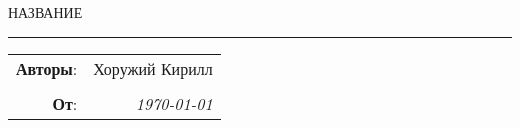 
\begin{center}
    \LARGE \textsc{НАЗВАНИЕ}
\end{center}

\hrule

\phantom{42}

\begin{flushright}
    \begin{tabular}{rr}
        \textbf{Авторы}: 
        & Хоружий Кирилл \\
        &\\
        \textbf{От}: &
        \textit{\today}\\
    \end{tabular}
\end{flushright}

